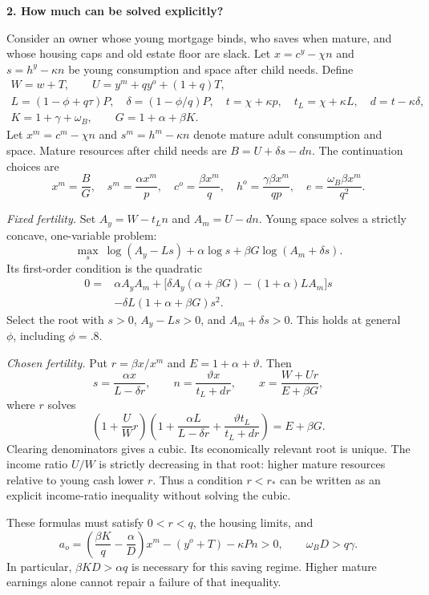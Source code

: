 \documentclass[11pt]{article}
\begin{document}
\newpage
\textbf{2. How much can be solved explicitly?}

Consider an owner whose young mortgage binds, who saves when mature, and whose
housing caps and old estate floor are slack. Let $x=c^y-\chi n$ and
$s=h^y-\kappa n$ be young consumption and space after child needs. Define
\begin{gather*}
W=w+T,\qquad U=y^m+qy^o+(1+q)T,\\
L=(1-\phi+q\tau)P,\quad \delta=(1-\phi/q)P,\quad
t=\chi+\kappa p,\quad t_L=\chi+\kappa L,\quad d=t-\kappa\delta,\\
K=1+\gamma+\omega_B,\qquad G=1+\alpha+\beta K.
\end{gather*}
Let $x^m=c^m-\chi n$ and $s^m=h^m-\kappa n$ denote mature adult consumption
and space. Mature resources after child needs are $B=U+\delta s-dn$.
The continuation choices are
\[
x^m=\frac BG,\quad s^m=\frac{\alpha x^m}{p},\quad
c^o=\frac{\beta x^m}{q},\quad h^o=\frac{\gamma\beta x^m}{qp},\quad
e=\frac{\omega_B\beta x^m}{q^2}.
\]

\textit{Fixed fertility.} Set $A_y=W-t_Ln$ and $A_m=U-dn$.
Young space solves a strictly concave, one-variable problem:
\[
\max_s\ \log(A_y-Ls)+\alpha\log s+\beta G\log(A_m+\delta s).
\]
Its first-order condition is the quadratic
\[
\boxed{\begin{aligned}
0={}&\alpha A_yA_m+
\big[\delta A_y(\alpha+\beta G)-(1+\alpha)LA_m\big]s\\
&-\delta L(1+\alpha+\beta G)s^2.
\end{aligned}}
\]
Select the root with $s>0$, $A_y-Ls>0$, and $A_m+\delta s>0$.
This holds at general $\phi$, including $\phi=.8$.

\textit{Chosen fertility.} Put $r=\beta x/x^m$ and $E=1+\alpha+\vartheta$.
Then
\[
s=\frac{\alpha x}{L-\delta r},\qquad
n=\frac{\vartheta x}{t_L+dr},\qquad
x=\frac{W+Ur}{E+\beta G},
\]
where $r$ solves
\[
\left(1+\frac UW r\right)
\left(1+\frac{\alpha L}{L-\delta r}
+\frac{\vartheta t_L}{t_L+dr}\right)=E+\beta G.
\]
Clearing denominators gives a cubic. Its economically relevant root is unique.
The income ratio $U/W$ is strictly decreasing in that root: higher mature
resources relative to young cash lower $r$. Thus a condition $r<r_*$ can be
written as an explicit income-ratio inequality without solving the cubic.

These formulas must satisfy $0<r<q$, the housing limits, and
\[
a_o=\left(\frac{\beta K}{q}-\frac\alpha D\right)x^m
-(y^o+T)-\kappa Pn>0,\qquad \omega_BD>q\gamma.
\]
In particular, $\beta KD>\alpha q$ is necessary for this saving regime.
Higher mature earnings alone cannot repair a failure of that inequality.
\end{document}
